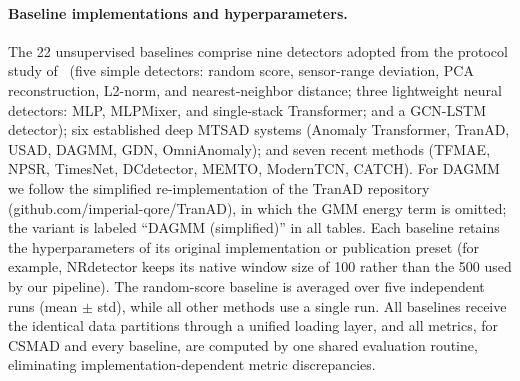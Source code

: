 \paragraph{Baseline implementations and hyperparameters.}
The 22 unsupervised baselines comprise nine detectors adopted from the protocol study
of~\cite{sarfraz2024quovadis} (five simple detectors: random score, sensor-range deviation, PCA
reconstruction, L2-norm, and nearest-neighbor distance; three lightweight neural detectors: MLP,
MLPMixer, and single-stack Transformer; and a GCN-LSTM detector); six established deep MTSAD
systems (Anomaly Transformer, TranAD, USAD, DAGMM, GDN, OmniAnomaly); and seven recent methods
(TFMAE, NPSR, TimesNet, DCdetector, MEMTO, ModernTCN, CATCH).
For DAGMM we follow the simplified re-implementation of the TranAD
repository~\cite{tuli2022tranad} (github.com/imperial-qore/TranAD), in which the GMM energy
term is omitted; the variant is labeled ``DAGMM (simplified)'' in all tables.
Each baseline retains the hyperparameters of its original implementation or publication preset
(for example, NRdetector keeps its native window size of 100 rather than the 500 used by our
pipeline).
The random-score baseline is averaged over five independent runs (mean $\pm$ std), while all
other methods use a single run.
All baselines receive the identical data partitions through a unified loading layer, and all
metrics, for CSMAD and every baseline, are computed by one shared evaluation routine, eliminating
implementation-dependent metric discrepancies.

